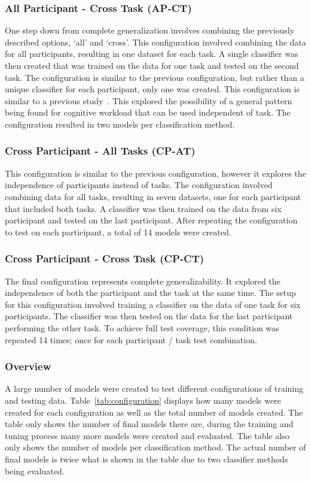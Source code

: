\documentclass[11pt]{article}
\begin{document}
		\subsubsection{All Participant - Cross Task (AP-CT)}
		One step down from complete generalization involves combining the previously described options, `all' and `cross'. This configuration involved combining the data for all participants, resulting in one dataset for each task. A single classifier was then created that was trained on the data for one task and tested on the second task. The configuration is similar to the previous configuration, but rather than a unique classifier for each participant, only one was created. This configuration is similar to a previous study~\cite{}. This explored the possibility of a general pattern being found for cognitive workload that can be used independent of task. The configuration resulted in two models per classification method.
		
		\subsubsection{Cross Participant - All Tasks (CP-AT)}
		This configuration is similar to the previous configuration, however it explores the independence of participants instead of tasks. The configuration involved combining data for all tasks, resulting in seven datasets, one for each participant that included both tasks. A classifier was then trained on the data from six participant and tested on the last participant. After repeating the configuration to test on each participant, a total of 14 models were created.
		
		\subsubsection{Cross Participant - Cross Task (CP-CT)}
		The final configuration represents complete generalizability. It explored the independence of both the participant and the task at the same time. The setup for this configuration involved training a classifier on the data of one task for six participants. The classifier was then tested on the data for the last participant performing the other task. To achieve full test coverage, this condition was repeated 14 times; once for each participant / task test combination.
		
		\subsubsection{Overview}
		A large number of models were created to test different configurations of training and testing data. Table~\ref{tab:configuration} displays how many models were created for each configuration as well as the total number of models created. The table only shows the number of final models there are, during the training and tuning process many more models were created and evaluated. The table also only shows the number of models per classification method. The actual number of final models is twice what is shown in the table due to two classifier methods being evaluated.
		
\end{document}

